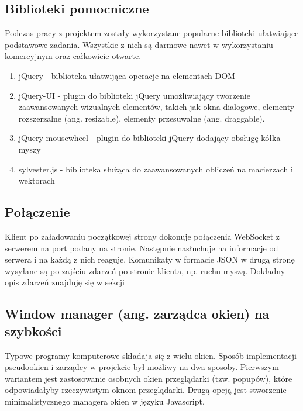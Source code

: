\subsection{Biblioteki pomocniczne}
Podczas pracy z projektem zostały wykorzystane popularne biblioteki ułatwiające podstawowe zadania. Wszystkie z nich są darmowe nawet w wykorzystaniu komercyjnym oraz całkowicie otwarte.
\begin{enumerate}
  \item jQuery - biblioteka ułatwijąca operacje na elementach DOM
  \item jQuery-UI - plugin do biblioteki jQuery umożliwiający tworzenie zaawansowanych wizualnych elementów, takich jak okna dialogowe, elementy rozszerzalne (ang. resizable), elementy przesuwalne (ang. draggable).
  \item jQuery-mousewheel - plugin do biblioteki jQuery dodający obsługę kółka myszy
  \item sylvester.js - biblioteka służąca do zaawansowanych obliczeń na macierzach i wektorach
\end{enumerate}


\subsection{Połączenie}
Klient po załadowaniu początkowej strony dokonuje połączenia WebSocket z serwerem na port podany na stronie. Następnie nasłuchuje na informacje od serwera i na każdą z nich reaguje. Komunikaty w formacie JSON w drugą stronę wysyłane są po zajściu zdarzeń po stronie klienta, np. ruchu myszą. Dokładny opis zdarzeń znajduję się w sekcji %

\subsection{Window manager (ang. zarządca okien) na szybkości}
Typowe programy komputerowe składaja się z wielu okien. Sposób implementacji pseudookien i zarządcy w projekcie był możliwy na dwa sposoby.
Pierwszym wariantem jest zastosowanie osobnych okien przeglądarki (tzw. popupów), które odpowiadałyby rzeczywistym oknom przeglądarki.
Drugą opcją jest stworzenie minimalistycznego managera okien w języku Javascript.

